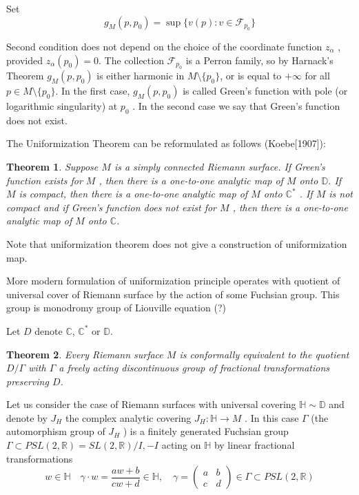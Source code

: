 \documentclass[12pt]{article}
\newtheorem{theorem}{Theorem}
\begin{document}
Set
\begin{equation}
  \label{eq:104}
  g_{M} (p, p_{0} ) = \sup\{v(p) : v\in \mathcal{F}_{p_{0}} \}
\end{equation}
  
Second condition does not depend on the choice of the coordinate function $z_{\alpha}$ , provided
$z_{\alpha} (p_{0} ) = 0$. The collection $\mathcal{F}_{p_{0}}$ is a Perron family, so by Harnack's
Theorem      $g_M (p, p_{0} )$ is either harmonic in  $M \setminus \{p_{0} \}$, or  is equal to $+\infty$  for
all $p\in M \setminus \{p_{0} \}$.
In the first case, $g_{M} (p, p_{0} )$ is called Green's function with pole (or logarithmic singularity)
at $p_{0}$ . In the second case we say that Green's function does not exist.

The Uniformization Theorem can be reformulated as follows (Koebe[1907]):

\begin{theorem}
  Suppose $M$ is a simply connected Riemann surface. If Green's function exists for $M$ , then there
  is a one-to-one analytic map of $M$ onto $\mathbb{D}$. If $M$ is compact, then there is a
  one-to-one analytic map of $M$ onto $\mathbb{C}^{*}$ . If $M$ is not compact and if Green's
  function does not exist for $M$ , then there is a one-to-one analytic map of $M$ onto
  $\mathbb{C}$.
\end{theorem}

Note that uniformization theorem does not give a construction of uniformization map. 

More modern formulation of uniformization principle operates with quotient of universal cover of
Riemann surface by the action of some Fuchsian group. This group is monodromy group of Liouville
equation (?)

Let $D$ denote $\mathbb{C}$, $\mathbb{C}^{*}$ or $\mathbb{D}$.
\begin{theorem}
Every Riemann surface $M$ is conformally equivalent to the quotient $D/\Gamma$ with $\Gamma$  a freely acting
discontinuous group of fractional transformations preserving $D$.
\end{theorem}

Let us consider the case of Riemann surfaces with universal covering $\mathbb{H}\sim \mathbb{D}$ and
denote by $J_{H}$ the complex analytic covering $J_{H} : \mathbb{H}\to M$ . In this case $\Gamma$
(the automorphism group of $J_{H}$ ) is a finitely generated Fuchsian 
group $\Gamma\subset PSL(2,
\mathbb{R}) = SL(2, \mathbb{R})/{I, -I}$ acting on $\mathbb{H}$ by linear fractional transformations
\begin{equation}
  \label{eq:106}
  w\in \mathbb{H}\quad \gamma\cdot w=\frac{aw+b}{cw+d}\in\mathbb{H},\quad
  \gamma=\begin{pmatrix} a & b\\ c & d\end{pmatrix} \in\Gamma\subset PSL(2,\mathbb{R})
\end{equation}
\end{document}
